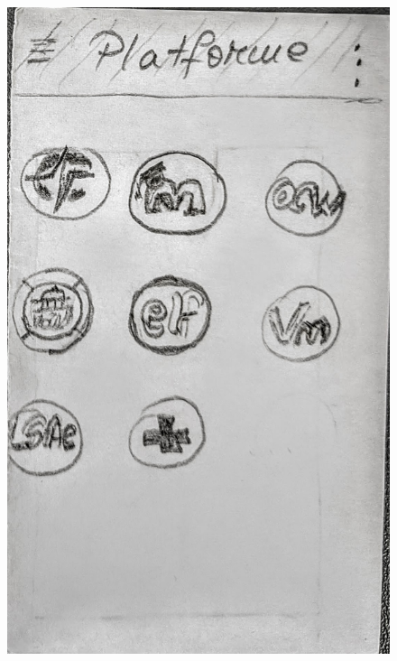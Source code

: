 \begin{figure}[ht]
         \includegraphics[height=0.279\textheight]{figures/app/paper/platforms.jpg}

\end{figure}
